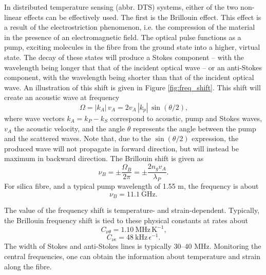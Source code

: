 \documentclass{standalone}
\begin{document}
In distributed temperature sensing (abbr. DTS) systems, either of the two non-linear effects can be effectively used. The first is the Brillouin effect. This effect is a result of the electrostriction phenomenon, i.e. the compression of the material in the presence of an electromagnetic field. The optical pulse functions as a pump, exciting molecules in the fibre from the ground state into a higher, virtual state. The decay of these states will produce a Stokes component -- with the wavelength being longer that that of the incident optical wave -- or an anti-Stokes component, with the wavelength being shorter than that of the incident optical wave. An illustration of this shift is given in Figure \ref{fig:freq_shift}. 
This shift will create an acoustic wave at frequency
\begin{equation}
\Omega = \left|k_A\right| \, v_A = 2 v_A \, \left|k_p\right| \, \sin\left(\theta / 2 \right) \textrm{,}
\end{equation}
where wave vectors $k_A = k_P - k_S$ correspond to acoustic, pump and Stokes waves, $v_A$ the acoustic velocity, and the angle $\theta$ represents the angle between the pump and the scattered waves. Note that, due to the $\sin\left(\theta / 2\right)$ expression, the produced wave will not propagate in forward direction, but will instead be maximum in backward direction. The Brillouin shift is given as
\begin{equation}
\nu_B = \pm \frac{\Omega_B}{2 \pi} = \pm \frac{2 n_g v_A}{\lambda_P} \textrm{.}
\end{equation}
For silica fibre, and a typical pump wavelength of 1.55 \textmu m, the frequency is about 
\begin{equation}
\nu_B = \SI{11.1}{\giga \hertz} \textrm{.}
\end{equation}

The value of the frequency shift is temperature- and strain-dependent. Typically, the Brillouin frequency shift is tied to these physical constants at rates about
\begin{equation}
C_{\nu\theta} = \SI{1.10}{\mega \hertz \, \kelvin^{-1}} \textrm{,}
\end{equation}
\begin{equation}
C_{\nu\epsilon} = \SI{48}{\kilo \hertz \, \epsilon^{-1}} \textrm{.}
\end{equation}
The width of Stokes and anti-Stokes lines is typically 30--40 MHz. Monitoring the central frequencies, one can obtain the information about temperature and strain along the fibre. \\
\end{document}
